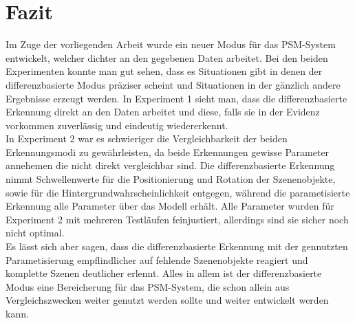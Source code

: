 \section{Fazit}
Im Zuge der vorliegenden Arbeit wurde ein neuer Modus für das PSM-System entwickelt, welcher dichter an den gegebenen Daten arbeitet. Bei den beiden Experimenten konnte man gut sehen, dass es Situationen gibt in denen der differenzbasierte Modus präziser scheint und Situationen in der gänzlich andere Ergebnisse erzeugt werden. In Experiment 1 sieht man, dass die differenzbasierte Erkennung direkt an den Daten arbeitet und diese, falls sie in der Evidenz vorkommen zuverlässig und eindeutig wiedererkennt.\smallskip\\
In Experiment 2 war es schwieriger die Vergleichbarkeit der beiden Erkennungsmodi zu gewährleisten, da beide Erkennungen gewisse Parameter annehemen die nicht direkt vergleichbar sind. Die differenzbasierte Erkennung nimmt Schwellenwerte für die Positionierung und Rotation der Szenenobjekte, sowie für die Hintergrundwahrscheinlichkeit entgegen, während die parametisierte Erkennung alle Parameter über das Modell erhält. Alle Parameter wurden für Experiment 2 mit mehreren Testläufen feinjustiert, allerdings sind sie sicher noch nicht optimal.\smallskip\\
Es lässt sich aber sagen, dass die differenzbasierte Erkennung mit der gennutzten Parametisierung empflindlicher auf fehlende Szenenobjekte reagiert und komplette Szenen deutlicher erlennt. Alles in allem ist der differenzbasierte Modus eine Bereicherung für das PSM-System, die schon allein aus Vergleichszwecken weiter genutzt werden sollte und weiter entwickelt werden kann.

